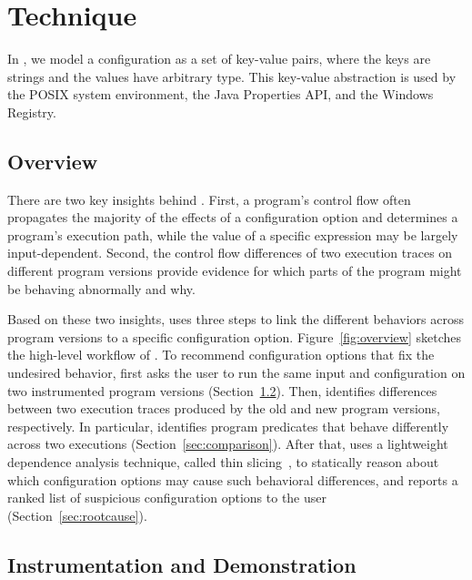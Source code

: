 
\section{Technique}
\label{sec:technique}

In \ourtool, we model a configuration as a set of key-value
pairs, where the keys are strings and the values have
arbitrary type. 
This key-value abstraction
is used by the POSIX system environment, the Java
Properties API, and the Windows Registry.


\subsection{Overview}

There are two key insights behind \ourtool. First,
a program's control flow often propagates the majority of
the effects of a configuration option and determines
a program's execution path, while the value of a
specific expression may be largely input-dependent.
Second, the control flow differences of two execution
traces on different program versions provide evidence
for which parts of the program might be behaving
abnormally and why.

Based on these two insights, \ourtool uses three
steps to link the different behaviors across program
versions to a specific configuration option.
Figure~\ref{fig:overview} sketches the high-level workflow of
\ourtool. To recommend configuration options that
fix the undesired behavior, \ourtool first asks the
user to run the same input and
configuration on two instrumented program versions
(Section~\ref{sec:profiling}).
Then, \ourtool identifies differences between
two execution traces produced
by the old and new program versions, respectively.
In particular, \ourtool identifies program predicates
that behave differently across two executions
(Section~\ref{sec:comparison}).
After that, \ourtool uses a lightweight dependence
analysis technique, called thin slicing~\cite{},
to statically reason about which configuration
options may cause such behavioral differences,
and reports a ranked list of 
suspicious configuration options to the user (Section~\ref{sec:rootcause}).

\subsection{Instrumentation and Demonstration}
\label{sec:profiling}

